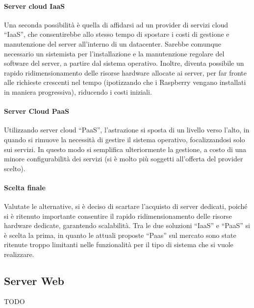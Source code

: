 \paragraph{Server cloud IaaS}
Una seconda possibilità è quella di affidarsi ad un provider di servizi cloud ``IaaS'', che consentirebbe allo stesso tempo di spostare i costi di gestione e manutenzione del server all'interno di un datacenter. Sarebbe comunque necessario un sistemista per l'installazione e la manutenzione regolare del software del server, a partire dal sistema operativo. Inoltre, diventa possibile un rapido ridimensionamento delle risorse hardware allocate ai server, per far fronte alle richieste crescenti nel tempo (ipotizzando che i Raspberry vengano installati in maniera progressiva), riducendo i costi iniziali.
\paragraph{Server Cloud PaaS}
Utilizzando server cloud ``PaaS'', l'astrazione si sposta di un livello verso l'alto, in quando si rimuove la necessità di gestire il sistema operativo, focalizzandosi solo sui servizi. In questo modo si semplifica ulteriormente la gestione, a costo di una minore configurabilità dei servizi (si è molto più soggetti all'offerta del provider scelto).
\paragraph{Scelta finale}
Valutate le alternative, si è deciso di scartare l'acquisto di server dedicati, poiché si è ritenuto importante consentire il rapido ridimensionamento delle risorse hardware dedicate, garantendo scalabilità. Tra le due soluzioni ``IaaS'' e ``PaaS'' si è scelta la prima, in quanto le attuali proposte ``Paas'' sul mercato sono state ritenute troppo limitanti nelle funzionalità per il tipo di sistema che si vuole realizzare.

\subsection{Server Web}
TODO

